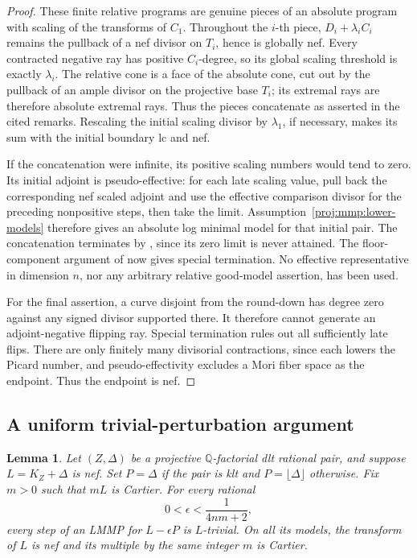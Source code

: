 \documentclass[11pt,letterpaper]{article}
\newcommand{\Q}{\mathbb{Q}}
\newtheorem{lemma}[theorem]{Lemma}
\theoremstyle{definition}
\theoremstyle{remark}
\begin{document}
\begin{proof}
These finite relative programs are genuine pieces of an absolute
program with scaling of the transforms of \(C_1\).
Throughout the \(i\)-th piece, \(D_i+\lambda_i C_i\) remains
the pullback of a nef divisor on \(T_i\), hence is globally nef.
Every contracted negative ray has positive \(C_i\)-degree,
so its global scaling threshold is exactly \(\lambda_i\).
The relative cone is a face of the absolute cone, cut out by
the pullback of an ample divisor on the projective base \(T_i\);
its extremal rays are therefore absolute extremal rays.
Thus the pieces concatenate as asserted in the cited remarks.
Rescaling the initial scaling divisor by \(\lambda_1\), if
necessary, makes its sum with the initial boundary lc and nef.

If the concatenation were infinite, its positive scaling numbers
would tend to zero. Its initial adjoint is pseudo-effective:
for each late scaling value, pull back the corresponding nef
scaled adjoint and use the effective comparison divisor for
the preceding nonpositive steps, then take the limit.
Assumption~\ref{proj:mmp:lower-models} therefore gives an absolute
log minimal model for that initial pair. The concatenation
terminates by \cite[Theorem~1.9(iii)]{Proj-Birkar2012Special}, since
its zero limit is never attained. The floor-component argument
of \cite[Lemma~3.6]{Proj-Birkar2010} now gives special termination.
No effective representative in dimension \(n\), nor any
arbitrary relative good-model assertion, has been used.

For the final assertion, a curve disjoint from the round-down
has degree zero against any signed divisor supported there.
It therefore cannot generate an adjoint-negative flipping ray.
Special termination rules out all sufficiently late flips.
There are only finitely many divisorial contractions, since
each lowers the Picard number, and pseudo-effectivity excludes
a Mori fiber space as the endpoint. Thus the endpoint is nef.
\end{proof}

\subsection{A uniform trivial-perturbation argument}

\begin{lemma}\label{proj:mmp:trivial-perturbation}
Let \((Z,\Delta)\) be a projective \(\Q\)-factorial dlt rational
pair, and suppose \(L=K_Z+\Delta\) is nef.
Set \(P=\Delta\) if the pair is klt and
\(P=\lfloor\Delta\rfloor\) otherwise.
Fix \(m>0\) such that \(mL\) is Cartier.
For every rational
\[
 0<\epsilon<\frac{1}{4nm+2},
\]
every step of an LMMP for \(L-\epsilon P\) is \(L\)-trivial.
On all its models, the transform of \(L\) is nef and its
multiple by the same integer \(m\) is Cartier.
\end{lemma}
\end{document}
